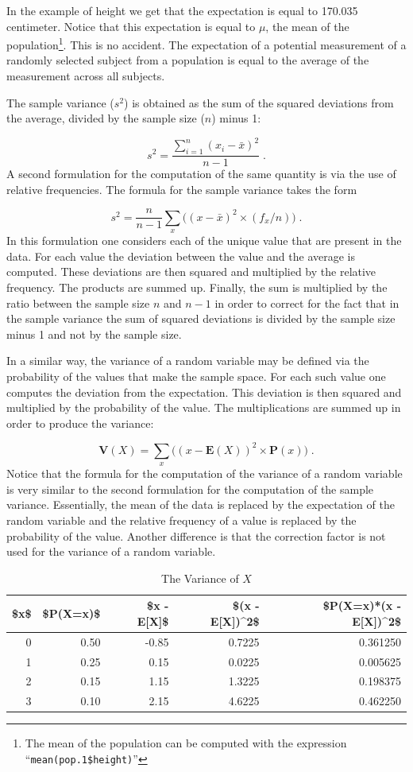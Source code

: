\documentclass[
]{krantz}
\newcommand{\Expec}{\mathbf{E}}
\newcommand{\Prob}{\mathbf{P}}
\newcommand{\Var}{\mathbf{V}}
\theoremstyle{definition}
\theoremstyle{definition}
\theoremstyle{definition}
\theoremstyle{remark}
\begin{document}
In the example of height we get that the expectation is equal to 170.035
centimeter. Notice that this expectation is equal to \(\mu\), the mean of
the population\footnote{The mean of the population can be computed with the expression
  ``\texttt{mean(pop.1\$height)}''}. This is no accident. The expectation of a potential
measurement of a randomly selected subject from a population is equal to
the average of the measurement across all subjects.

The sample variance (\(s^2\)) is obtained as the sum of the squared
deviations from the average, divided by the sample size (\(n\)) minus 1:

\[s^2 = \frac{\sum_{i=1}^n (x_i - \bar x)^2}{n-1}\;.\] A second
formulation for the computation of the same quantity is via the use of
relative frequencies. The formula for the sample variance takes the form

\[s^2 = \frac{n}{n-1}\sum_x \big((x - \bar x)^2\times (f_x/n)\big)\;.\]
In this formulation one considers each of the unique value that are
present in the data. For each value the deviation between the value and
the average is computed. These deviations are then squared and
multiplied by the relative frequency. The products are summed up.
Finally, the sum is multiplied by the ratio between the sample size \(n\)
and \(n-1\) in order to correct for the fact that in the sample variance
the sum of squared deviations is divided by the sample size minus 1 and
not by the sample size.

In a similar way, the variance of a random variable may be defined via
the probability of the values that make the sample space. For each such
value one computes the deviation from the expectation. This deviation is
then squared and multiplied by the probability of the value. The
multiplications are summed up in order to produce the variance:

\[\Var(X) = \sum_x\big( (x-\Expec(X))^2 \times \Prob(x)\big)\;.\] Notice
that the formula for the computation of the variance of a random
variable is very similar to the second formulation for the computation
of the sample variance. Essentially, the mean of the data is replaced by
the expectation of the random variable and the relative frequency of a
value is replaced by the probability of the value. Another difference is
that the correction factor is not used for the variance of a random
variable.

\begin{table}[t]

\caption{\label{tab:tab3}The Variance of $X$}
\centering
\begin{tabular}{rrrrr}
\toprule
\$x\$ & \$P(X=x)\$ & \$x - E[X]\$ & \$(x - E[X])\textasciicircum{}2\$ & \$P(X=x)*(x - E[X])\textasciicircum{}2\$\\
\midrule
0 & 0.50 & -0.85 & 0.7225 & 0.361250\\
1 & 0.25 & 0.15 & 0.0225 & 0.005625\\
2 & 0.15 & 1.15 & 1.3225 & 0.198375\\
3 & 0.10 & 2.15 & 4.6225 & 0.462250\\
\bottomrule
\end{tabular}
\end{table}
\end{document}
